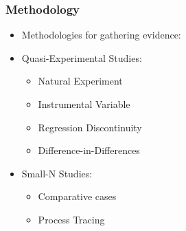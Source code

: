 \documentclass[xcolor=x11names,compress]{beamer}\usepackage[]{graphicx}\usepackage[]{xcolor}
\renewcommand{\(}{\begin{columns}}
\renewcommand{\)}{\end{columns}}
\newcommand{\<}[1]{\begin{column}{#1}}
\renewcommand{\>}{\end{column}}
\begin{document}
\begin{frame}
\frametitle{Methodology}
\begin{itemize}
\item Methodologies for gathering evidence:
\pause
\item Quasi-Experimental Studies:
\pause
\begin{itemize}
\item Natural Experiment
\pause
\item Instrumental Variable
\pause
\item Regression Discontinuity
\pause
\item Difference-in-Differences
\end{itemize}
\end{itemize}
\begin{itemize}
\item Small-N Studies:
\pause
\begin{itemize}
\item Comparative cases
\pause
\item Process Tracing
\end{itemize}
\end{itemize}
\end{frame}
\end{document}
